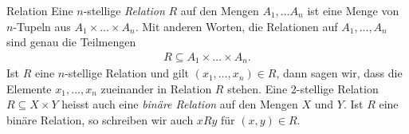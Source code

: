 \begin{definition}{Relation}
Eine $n$-stellige \textit{Relation} $R$ auf den Mengen $A_1,\dots A_n$ ist eine Menge von $n$-Tupeln aus $A_1\times\dots \times A_n$. Mit anderen Worten, die Relationen auf $A_1,\dots,A_n$ sind genau die Teilmengen
\begin{align*}
R\subseteq A_1\times\dots \times A_n.
\end{align*}
Ist $R$ eine $n$-stellige Relation und gilt $(x_1,\dots,x_n)\in R$, dann sagen wir, dass die Elemente $x_1,\dots,x_n$ zueinander in Relation $R$ stehen.
\tcblower
Eine $2$-stellige Relation $R\subseteq X\times Y$ heisst auch eine \textit{binäre Relation} auf den Mengen $X$ und $Y$. Ist $R$ eine binäre Relation, so schreiben wir auch $xRy$ für $(x,y)\in R$.
\end{definition}

